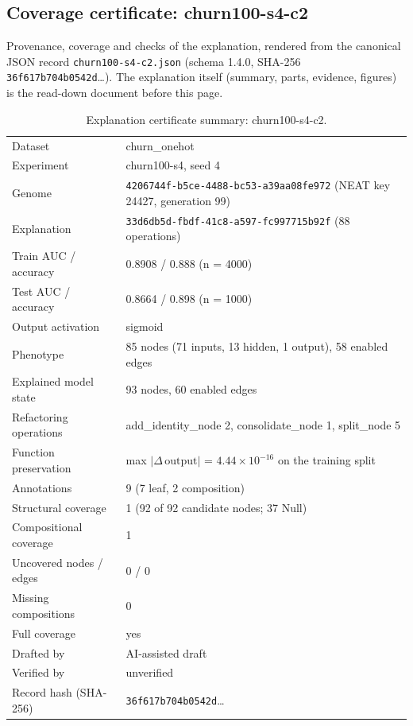 \providecommand{\explaneatcertdir}[1]{}
\begin{drafted}
\section{Coverage certificate: churn100-s4-c2}\label{app:churn100-s4-c2:sec}
Provenance, coverage and checks of the explanation, rendered from the canonical JSON record \texttt{churn100-s4-c2.json} (schema 1.4.0, SHA-256 \texttt{36f617b704b0542d}\ldots). The explanation itself (summary, parts, evidence, figures) is the read-down document before this page.

\begin{table}[htbp]
\centering\small
\begin{tabularx}{\linewidth}{@{}lX@{}}
\toprule
Dataset & churn\_\allowbreak{}onehot \\
Experiment & churn100-s4, seed 4 \\
Genome & \texttt{4206744f-b5ce-4488-bc53-a39aa08fe972} (NEAT key 24427, generation 99) \\
Explanation & \texttt{33d6db5d-fbdf-41c8-a597-fc997715b92f} (88 operations) \\
Train AUC / accuracy & 0.8908 / 0.888 (n = 4000) \\
Test AUC / accuracy & 0.8664 / 0.898 (n = 1000) \\
Output activation & sigmoid \\
Phenotype & 85 nodes (71 inputs, 13 hidden, 1 output), 58 enabled edges \\
Explained model state & 93 nodes, 60 enabled edges \\
Refactoring operations & add\_\allowbreak{}identity\_\allowbreak{}node 2, consolidate\_\allowbreak{}node 1, split\_\allowbreak{}node 5 \\
Function preservation & max $|\Delta\,\mathrm{output}|$ = $4.44\times 10^{-16}$ on the training split \\
Annotations & 9 (7 leaf, 2 composition) \\
Structural coverage & 1 (92 of 92 candidate nodes; 37 Null) \\
Compositional coverage & 1 \\
Uncovered nodes / edges & 0 / 0 \\
Missing compositions & 0 \\
Full coverage & yes \\
Drafted by & AI-assisted draft \\
Verified by & unverified \\
Record hash (SHA-256) & \texttt{36f617b704b0542d}\ldots \\
\bottomrule
\end{tabularx}
\caption{Explanation certificate summary: churn100-s4-c2.}
\label{app:churn100-s4-c2:summary}
\end{table}

\end{drafted}
